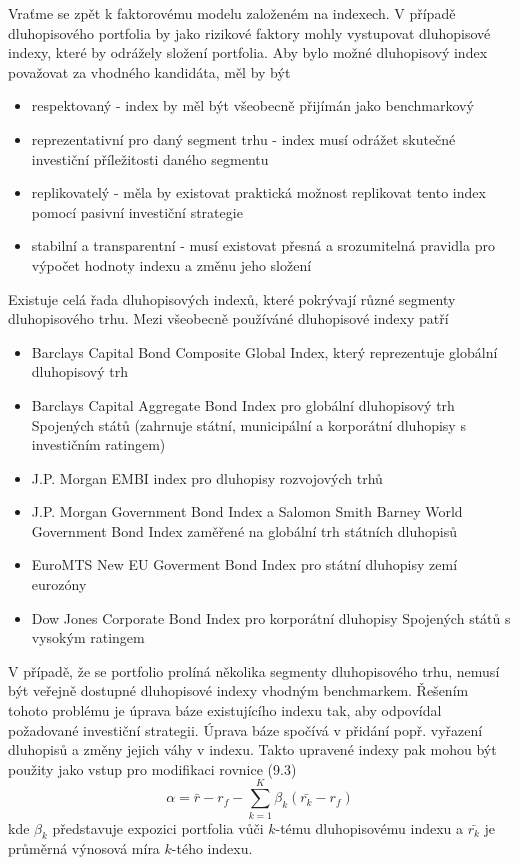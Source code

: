\documentclass[a4paper]{book}
\begin{document}
Vraťme se zpět k faktorovému modelu založeném na indexech. V případě dluhopisového portfolia by jako rizikové faktory mohly vystupovat dluhopisové indexy, které by odrážely složení portfolia. Aby bylo možné dluhopisový index považovat za vhodného kandidáta, měl by být
\begin{itemize}
\item respektovaný - index by měl být všeobecně přijímán jako benchmarkový
\item reprezentativní pro daný segment trhu - index musí odrážet skutečné investiční příležitosti daného segmentu
\item replikovatelý - měla by existovat praktická možnost replikovat tento index pomocí pasivní investiční strategie
\item stabilní a transparentní - musí existovat přesná a srozumitelná pravidla pro výpočet hodnoty indexu a změnu jeho složení
\end{itemize}

Existuje celá řada dluhopisových indexů, které pokrývají různé segmenty dluhopisového trhu. Mezi všeobecně používáné dluhopisové indexy patří
\begin{itemize}
\item Barclays Capital Bond Composite Global Index, který reprezentuje globální dluhopisový trh
\item Barclays Capital Aggregate Bond Index pro globální dluhopisový trh Spojených států (zahrnuje státní, municipální a korporátní dluhopisy s investičním ratingem)
\item J.P. Morgan EMBI index pro dluhopisy rozvojových trhů 
\item J.P. Morgan Government Bond Index a Salomon Smith Barney World Government Bond Index zaměřené na globální trh státních dluhopisů
\item EuroMTS New EU Goverment Bond Index pro státní dluhopisy zemí eurozóny
\item Dow Jones Corporate Bond Index pro korporátní dluhopisy Spojených států s vysokým ratingem
\end{itemize}

V případě, že se portfolio prolíná několika segmenty dluhopisového trhu, nemusí být veřejně dostupné dluhopisové indexy vhodným benchmarkem. Řešením tohoto problému je úprava báze existujícího indexu tak, aby odpovídal požadované investiční strategii. Úprava báze spočívá v přidání popř. vyřazení dluhopisů a změny jejich váhy v indexu. Takto upravené indexy pak mohou být použity jako vstup pro modifikaci rovnice (9.3)
\begin{equation*}
\alpha = \bar{r} - r_f - \sum_{k=1}^K \beta_k (\bar{r_k} - r_f)
\end{equation*}
kde $\beta_k$ představuje expozici portfolia vůči $k$-tému dluhopisovému indexu a $\bar{r_k}$ je průměrná výnosová míra $k$-tého indexu.
\end{document}
